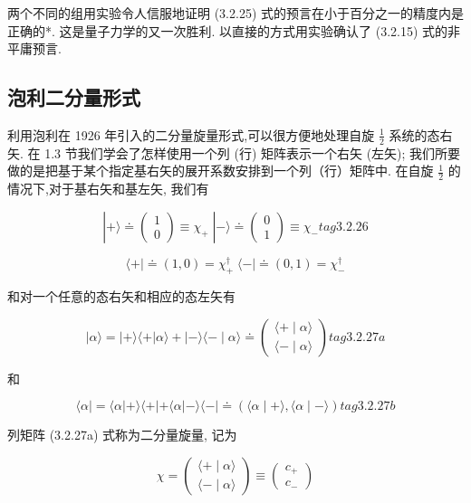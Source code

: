 两个不同的组用实验令人信服地证明 (3.2.25) 式的预言在小于百分之一的精度内是正确的*. 这是量子力学的又一次胜利. 以直接的方式用实验确认了 (3.2.15) 式的非平庸预言.

\subsection{泡利二分量形式} 

利用泡利在 1926 年引入的二分量旋量形式,可以很方便地处理自旋 $\frac{1}{2}$ 系统的态右矢. 在 1.3 节我们学会了怎样使用一个列 (行) 矩阵表示一个右矢 (左矢); 我们所要做的是把基于某个指定基右矢的展开系数安排到一个列（行）矩阵中. 在自旋 $\frac{1}{2}$ 的情况下,对于基右矢和基左矢, 我们有

$$
\left| {+\rangle \doteq \left( \begin{array}{l} 1 \\ 0 \end{array}\right) \equiv {\chi }_{ + }\;}\right| - \rangle \doteq \left( \begin{array}{l} 0 \\ 1 \end{array}\right) \equiv {\chi }_{ - } tag{3.2.26}
$$

$$
\langle + \mid \doteq \left( {1,0}\right) = {\chi }_{ + }^{ \dagger }\;\langle - \mid \doteq \left( {0,1}\right) = {\chi }_{ - }^{ \dagger }
$$

和对一个任意的态右矢和相应的态左矢有

$$
\left| {\alpha \rangle = }\right| + \rangle \langle + \left| {\alpha \rangle + }\right| - \rangle \langle - \mid \alpha \rangle \doteq \left( \begin{array}{l} \langle + \mid \alpha \rangle \\ \langle - \mid \alpha \rangle \end{array}\right) tag{3.2.27a}
$$

和

$$
\langle \alpha \left| { = \langle \alpha }\right| + \rangle \langle + \left| {+\langle \alpha }\right| - \rangle \langle - | \doteq \left( {\langle \alpha \mid + \rangle ,\langle \alpha \mid - \rangle }\right) tag{3.2.27b}
$$

列矩阵 (3.2.27a) 式称为二分量旋量, 记为

$$
\chi = \left( \begin{array}{l} \langle + \mid \alpha \rangle \\ \langle - \mid \alpha \rangle \end{array}\right) \equiv \left( \begin{array}{l} {c}_{ + } \\ {c}_{ - } \end{array}\right)
$$

